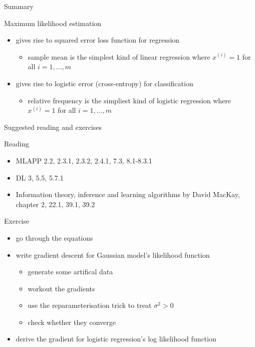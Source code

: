 \documentclass[ignorenonframetext,]{beamer}
\providecommand{\tightlist}{%
  \setlength{\itemsep}{0pt}\setlength{\parskip}{0pt}}
\begin{document}
\begin{frame}{Summary}
\protect\hypertarget{summary}{}

Maximum likelihood estimation

\begin{itemize}
\tightlist
\item
  gives rise to squared error loss function for regression

  \begin{itemize}
  \tightlist
  \item
    sample mean is the simplest kind of linear regression where
    \(x^{(i)}=1\) for all \(i=1,\ldots,m\)
  \end{itemize}
\item
  gives rise to logistic error (cross-entropy) for classification

  \begin{itemize}
  \tightlist
  \item
    relative frequency is the simpliest kind of logistic regression
    where \(x^{(i)}=1\) for all \(i=1,\ldots,m\)
  \end{itemize}
\end{itemize}

\end{frame}

\begin{frame}{Suggested reading and exercises}
\protect\hypertarget{suggested-reading-and-exercises}{}

Reading

\begin{itemize}
\tightlist
\item
  MLAPP 2.2, 2.3.1, 2.3.2, 2.4.1, 7.3, 8.1-8.3.1
\item
  DL 3, 5.5, 5.7.1
\item
  Information theory, inference and learning algorithms by David MacKay,
  chapter 2, 22.1, 39.1, 39.2
\end{itemize}

\bigskip

Exercise

\begin{itemize}
\tightlist
\item
  go through the equations
\item
  write gradient descent for Gaussian model's likelihood function

  \begin{itemize}
  \tightlist
  \item
    generate some artifical data
  \item
    workout the gradients
  \item
    use the reparameterisation trick to treat \(\sigma^2 >0\)
  \item
    check whether they converge
  \end{itemize}
\item
  derive the gradient for logistic regression's log likelihood function
\end{itemize}

\end{frame}
\end{document}
